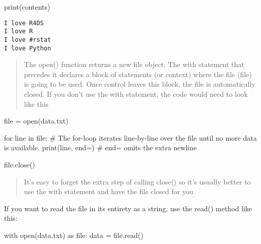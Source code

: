 \documentclass[
  letterpaper,
  DIV=11,
  numbers=noendperiod]{scrreprt}
\newenvironment{Shaded}{\begin{snugshade}}{\end{snugshade}}
\newcommand{\BuiltInTok}[1]{\textcolor[rgb]{0.00,0.46,0.62}{#1}}
\newcommand{\BuiltInTok}[1]{\textcolor[rgb]{0.00,0.48,0.65}{#1}}
\newcommand{\CommentTok}[1]{\textcolor[rgb]{0.37,0.37,0.37}{#1}}
\newcommand{\ControlFlowTok}[1]{\textcolor[rgb]{0.00,0.46,0.62}{#1}}
\newcommand{\ControlFlowTok}[1]{\textcolor[rgb]{0.00,0.48,0.65}{#1}}
\newcommand{\ImportTok}[1]{\textcolor[rgb]{0.00,0.46,0.62}{#1}}
\newcommand{\KeywordTok}[1]{\textcolor[rgb]{0.00,0.46,0.62}{#1}}
\newcommand{\NormalTok}[1]{\textcolor[rgb]{0.00,0.46,0.62}{#1}}
\newcommand{\OperatorTok}[1]{\textcolor[rgb]{0.37,0.37,0.37}{#1}}
\newcommand{\ImportTok}[1]{\textcolor[rgb]{0.00,0.48,0.65}{#1}}
\newcommand{\KeywordTok}[1]{\textcolor[rgb]{0.00,0.48,0.65}{#1}}
\newcommand{\NormalTok}[1]{\textcolor[rgb]{0.00,0.48,0.65}{#1}}
\newcommand{\OperatorTok}[1]{\textcolor[rgb]{0.37,0.37,0.37}{#1}}
\newcommand{\StringTok}[1]{\textcolor[rgb]{0.13,0.47,0.30}{#1}}
\begin{document}
\begin{Shaded}
\begin{Highlighting}[]
\begin{Shaded}
\begin{Highlighting}[]
\BuiltInTok{print}\NormalTok{(contents)}
\end{Highlighting}
\end{Shaded}

\begin{verbatim}
I love R4DS
I love R
I love #rstat
I love Python
\end{verbatim}

\begin{quote}
The open() function returns a new file object. The with statement that
precedes it declares a block of statements (or context) where the file
(file) is going to be used. Once control leaves this block, the file is
automatically closed. If you don't use the with statement, the code
would need to look like this
\end{quote}

\begin{Shaded}
\begin{Highlighting}[]
\BuiltInTok{file} \OperatorTok{=} \BuiltInTok{open}\NormalTok{(}\StringTok{\textquotesingle{}data.txt\textquotesingle{}}\NormalTok{) }

\ControlFlowTok{for}\NormalTok{ line }\KeywordTok{in} \BuiltInTok{file}\NormalTok{: }\CommentTok{\# The for{-}loop iterates line{-}by{-}line over the file until no   more data is    available.}
    \BuiltInTok{print}\NormalTok{(line, end}\OperatorTok{=}\StringTok{\textquotesingle{}\textquotesingle{}}\NormalTok{) }\CommentTok{\#   end=\textquotesingle{}\textquotesingle{}  omits   the extra   newline }

\BuiltInTok{file}\NormalTok{.close()}
\end{Highlighting}
\end{Shaded}

\begin{quote}
It's easy to forget the extra step of calling close() so it's usually
better to use the with statement and have the file closed for you
\end{quote}

If you want to read the file in its entirety as a string, use the read()
method like this:

\begin{Shaded}
\begin{Highlighting}[]
\ControlFlowTok{with} \BuiltInTok{open}\NormalTok{(}\StringTok{\textquotesingle{}data.txt\textquotesingle{}}\NormalTok{) }\ImportTok{as}    \BuiltInTok{file}\NormalTok{:}
\NormalTok{    data }\OperatorTok{=} \BuiltInTok{file}\NormalTok{.read()}
\end{Highlighting}
\end{Shaded}


\end{Highlighting}
\end{Shaded}
\end{document}
